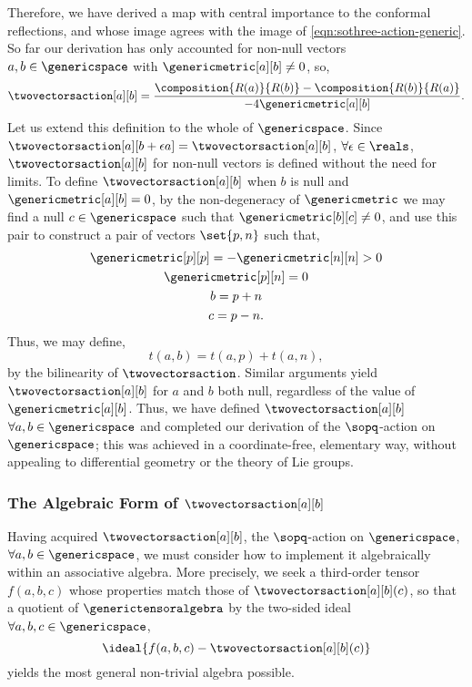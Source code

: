 \documentclass{article}
\begin{document}
Therefore, we have derived a map with central importance to the conformal reflections, and whose image agrees with the image of \eqref{eqn:sothree-action-generic}. So far our derivation has only accounted for non-null vectors $a,b\in\genericspace$ with $\genericmetric[a][b]\neq0$, so,
\begin{equation}
    \twovectorsaction[a][b]=\frac{\composition{R(a)}{R(b)}-\composition{R(b)}{R(a)}}{-4\genericmetric[a][b]}.
\end{equation}
\noindent Let us extend this definition to the whole of $\genericspace$. Since $\twovectorsaction[a][b+\epsilon a]=\twovectorsaction[a][b]$, $\forall\epsilon\in\reals$, $\twovectorsaction[a][b]$ for non-null vectors is defined without the need for limits. To define $\twovectorsaction[a][b]$ when $b$ is null and $\genericmetric[a][b]=0$, by the non-degeneracy of $\genericmetric$ we may find a null $c\in\genericspace$ such that $\genericmetric[b][c]\neq0$, and use this pair to construct a pair of vectors $\set{p,n}$ such that,
\begin{subequations}
\begin{gather}
    \genericmetric[p][p]=-\genericmetric[n][n]>0\\
    \genericmetric[p][n]=0\\
    b=p+n\\
    c=p-n.
\end{gather}
\end{subequations}
\noindent Thus, we may define,
\begin{equation}
    t(a,b)=t(a,p)+t(a,n),
\end{equation}
\noindent by the bilinearity of $\twovectorsaction$. Similar arguments yield $\twovectorsaction[a][b]$ for $a$ and $b$ both null, regardless of the value of $\genericmetric[a][b]$. Thus, we have defined $\twovectorsaction[a][b]$ $\forall a,b\in\genericspace$ and completed our derivation of the $\sopq$-action on $\genericspace$; this was achieved in a coordinate-free, elementary way, without appealing to differential geometry or the theory of Lie groups\cite{varadarajan}.

\subsubsection{The Algebraic Form of \texorpdfstring{$\twovectorsaction[a][b]$}{t(a,b)}}

Having acquired $\twovectorsaction[a][b]$, the $\sopq$-action on $\genericspace$, $\forall a,b\in\genericspace$, we must consider how to implement it algebraically within an associative algebra. More precisely, we seek a third-order tensor $f(a,b,c)$ whose properties match those of $\twovectorsaction[a][b](c)$, so that a quotient of $\generictensoralgebra$ by the two-sided ideal $\forall a,b,c\in\genericspace$,
\begin{equation}
    \ideal{f(a,b,c)-\twovectorsaction[a][b](c)}
\end{equation}
\noindent yields the most general non-trivial algebra possible.
\end{document}
